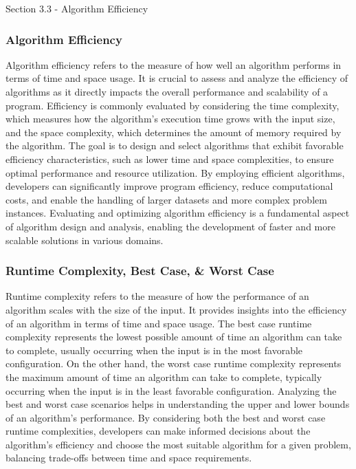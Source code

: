 \begin{notes}{Section 3.3 - Algorithm Efficiency}
    \subsubsection*{Algorithm Efficiency}

    Algorithm efficiency refers to the measure of how well an algorithm performs in terms of time and space usage. It is crucial to assess and analyze the efficiency of algorithms as it directly impacts the overall performance and scalability of a program. Efficiency is commonly evaluated by considering the time complexity, which measures how the algorithm's execution time grows with the input size, and the space complexity, 
    which determines the amount of memory required by the algorithm. The goal is to design and select algorithms that exhibit favorable efficiency characteristics, such as lower time and space complexities, to ensure optimal performance and resource utilization. By employing efficient algorithms, developers can significantly improve program efficiency, reduce computational costs, and enable the handling of larger datasets and 
    more complex problem instances. Evaluating and optimizing algorithm efficiency is a fundamental aspect of algorithm design and analysis, enabling the development of faster and more scalable solutions in various domains.
    
    \subsubsection*{Runtime Complexity, Best Case, \& Worst Case}
    
    Runtime complexity refers to the measure of how the performance of an algorithm scales with the size of the input. It provides insights into the efficiency of an algorithm in terms of time and space usage. The best case runtime complexity represents the lowest possible amount of time an algorithm can take to complete, usually occurring when the input is in the most favorable configuration. On the other hand, the worst case 
    runtime complexity represents the maximum amount of time an algorithm can take to complete, typically occurring when the input is in the least favorable configuration. Analyzing the best and worst case scenarios helps in understanding the upper and lower bounds of an algorithm's performance. By considering both the best and worst case runtime complexities, developers can make informed decisions about the algorithm's efficiency 
    and choose the most suitable algorithm for a given problem, balancing trade-offs between time and space requirements.
    

\end{notes}

